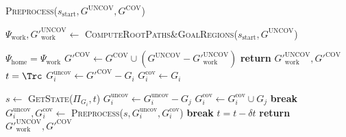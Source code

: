 {\begin{algorithm}
\caption{\textsc{Preprocess}($s_{\textrm{start}},G^{\textrm{UNCOV}},G^{\textrm{COV}}$)}\label{alg:2}
\begin{algorithmic}[1]
\State $\Psi_{\textrm{work}}, G'^{\textrm{UNCOV}}_{\textrm{work}} \leftarrow$ \textsc{ComputeRootPaths\&GoalRegions}($s_{\textrm{start}},G^{\textrm{UNCOV}}$)

    \State $\Psi_{\textrm{home}} = \Psi_{\textrm{work}}$
\EndIf
\State $G'^{\textrm{COV}} \leftarrow G^{\textrm{COV}} \cup (G^{\textrm{UNCOV}} - G'^{\textrm{UNCOV}}_{\textrm{work}})$
    \State \textbf{return} $G'^{\textrm{UNCOV}}_{\textrm{work}}, G'^{\textrm{COV}}$
\EndIf
{}
    \State $t = \Trc$
    \State $G_i^{\textrm{uncov}} \leftarrow G'^{\textrm{COV}} - G_i$
    \State $G_i^{\textrm{cov}} \leftarrow G_i$

    
        \State $s \leftarrow$ \textsc{GetState($\Pi_{G_i}, t$)}
                \State $G_i^{\textrm{uncov}} \leftarrow G_i^{\textrm{uncov}} - G_j$
                \State $G_i^{\textrm{cov}} \leftarrow G_i^{\textrm{cov}} \cup G_j$
            \EndIf
        \EndFor
            \State \textbf{break}
        \EndIf
        \State $G_i^{\textrm{uncov}},G_i^{\textrm{cov}} \leftarrow$ \textsc{Preprocess}($s,G_i^{\textrm{uncov}},G_i^{\textrm{cov}}$)
            \State \textbf{break}
        \EndIf
        \State $t = t - \delta t$
    \EndWhile
\EndFor
\State \textbf{return} $G'^{\textrm{UNCOV}}_{\textrm{work}}, G'^{\textrm{COV}}$

\end{algorithmic}
\end{algorithm}

}
